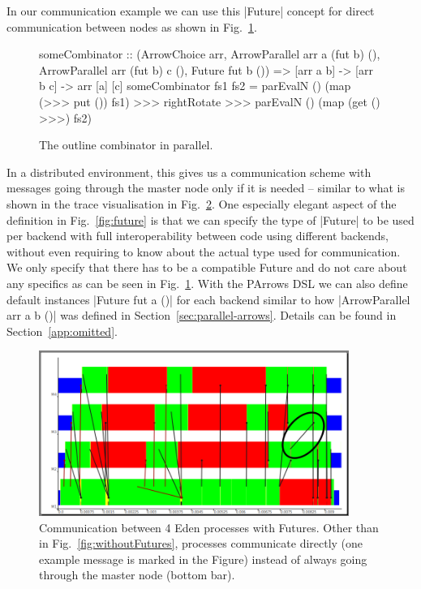 In our communication example we can use this |Future| concept for direct communication between nodes as shown in Fig.~\ref{fig:someCombinatorParallel}.
\begin{figure}[t]
\begin{code}
someCombinator :: (ArrowChoice arr,
	ArrowParallel arr a (fut b) (), 
	ArrowParallel arr (fut b) c (),
	Future fut b ()) =>
	[arr a b] -> [arr b c] -> arr [a] [c]
someCombinator fs1 fs2 =
	parEvalN () (map (>>> put ()) fs1) >>>
	rightRotate >>>
	parEvalN () (map (get () >>>) fs2)
\end{code}
\caption{The outline combinator in parallel.}
\label{fig:someCombinatorParallel}
\end{figure}
In a distributed environment, this gives us a communication scheme with messages going through the master node only if it is needed -- similar to what is shown in the trace visualisation in Fig.~\ref{fig:withFutures}. One especially elegant aspect of the definition in Fig.~\ref{fig:future} is that we can specify the type of |Future| to be used per backend with full interoperability between code using different backends, without even requiring to know about the actual type used for communication. We only specify that there has to be a compatible Future and do not care about any specifics as can be seen in Fig.~\ref{fig:someCombinatorParallel}. With the PArrows DSL we can also define default instances |Future fut a ()| for each backend similar to how |ArrowParallel arr a b ()| was defined in Section~\ref{sec:parallel-arrows}. Details can be found in Section~\ref{app:omitted}. 
\begin{figure}[ht]
	\centering
	\includegraphics[width=0.9\textwidth]{images/withFutures}
	\caption[with Futures]{Communication between 4 Eden processes with Futures. Other than in Fig.~\ref{fig:withoutFutures}, processes communicate directly (one example message is marked in the Figure) instead of always going through the master node (bottom bar).}
	\label{fig:withFutures}
\end{figure}
